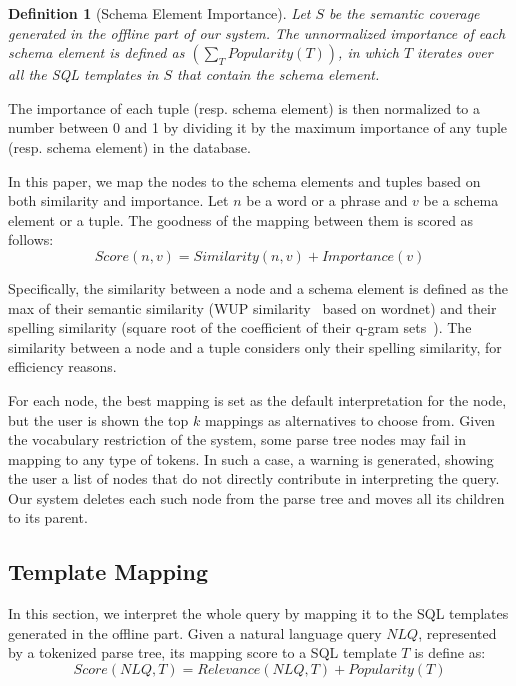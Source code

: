\documentclass{vldb}
\newtheorem{definition}{Definition}
\begin{document}
\begin{definition}[Schema Element Importance]
Let $S$ be the semantic coverage generated in the offline part of our system.  The unnormalized importance of each schema element is defined as $(\sum_{T} Popularity(T))$, in which $T$ iterates over all the SQL templates in $S$ that contain the schema element.  
\end{definition}

The importance of each tuple (resp. schema element) is then normalized to a number between 0 and 1 by dividing it by the maximum  importance of any tuple (resp. schema element) in the database.

In this paper, we map the nodes to the schema elements and tuples based on both similarity and importance.  Let $n$ be a word or a phrase and $v$ be a schema element or a tuple.  The goodness of the mapping between them is scored as follows: 
\begin{displaymath}
Score(n, v) = Similarity(n, v) + \mathit{Importance(v)}
\end{displaymath}

Specifically, the similarity between a node and a schema element is defined as the max of their semantic similarity (WUP similarity~\cite{DBLP:conf/acl/WuP94} based on wordnet) and their spelling similarity (square root of the coefficient of their q-gram sets~\cite{DBLP:journals/tods/XiaoWLYW11}).  The similarity between a node and a tuple considers only their spelling similarity, for efficiency reasons.  

For each node, the best mapping is set as the default interpretation for the node, but the user is shown the top $k$ mappings as alternatives to choose from.   Given the vocabulary restriction of the system, some parse tree nodes may fail in mapping to any type of tokens.  In such a case, a warning is generated, showing the user a list of nodes that do not directly contribute in interpreting the query.  Our system deletes each such node from the parse tree and moves all its children to its parent.  

\subsection{Template Mapping}
\label{subsec:mapping}

In this section, we interpret the whole query by mapping it to the SQL templates generated in the offline part.  Given a natural language query $\mathit{NLQ}$, represented by a tokenized parse tree, its mapping score to a SQL template $T$ is define as: 
\begin{displaymath}
Score(\mathit{NLQ}, T) = Relevance(\mathit{NLQ}, T) + Popularity(T)
\end{displaymath}
\end{document}
